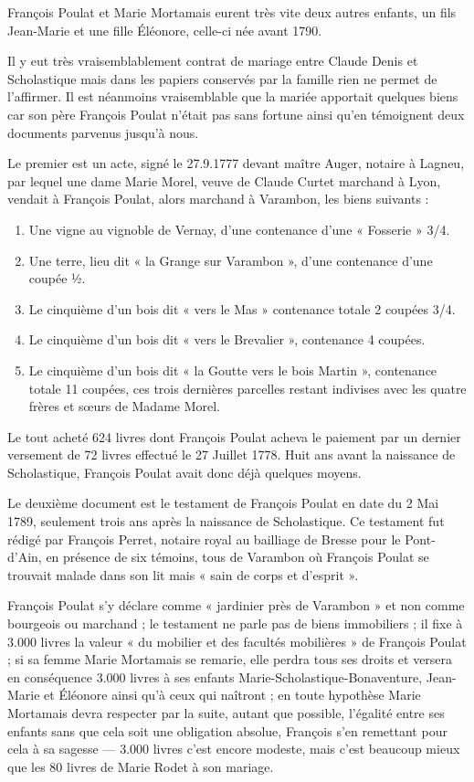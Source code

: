 \documentclass[11pt,a4paper]{report}
\providecommand{\tightlist}{\setlength{\itemsep}{0pt}\setlength{\parskip}{0pt}}
\begin{document}
François Poulat et Marie Mortamais eurent très vite deux autres enfants, un fils Jean-Marie et une fille Éléonore, celle-ci née avant 1790.

Il y eut très vraisemblablement contrat de mariage entre Claude Denis et Scholastique mais dans les papiers conservés par la famille rien ne permet de l'affirmer. Il est néanmoins vraisemblable que la mariée apportait quelques biens car son père François Poulat n'était pas sans fortune ainsi qu'en témoignent deux documents parvenus jusqu'à nous.

Le premier est un acte, signé le 27.9.1777 devant maître Auger, notaire à Lagneu, par lequel une dame Marie Morel, veuve de Claude Curtet marchand à Lyon, vendait à François Poulat, alors marchand à Varambon, les biens suivants :

\begin{enumerate}
\def\labelenumi{\arabic{enumi}.}
\tightlist
\item
  Une vigne au vignoble de Vernay, d'une contenance d'une « Fosserie » 3/4.
\item
  Une terre, lieu dit « la Grange sur Varambon », d'une contenance d'une coupée ½.
\item
  Le cinquième d'un bois dit « vers le Mas » contenance totale 2 coupées 3/4.
\item
  Le cinquième d'un bois dit « vers le Brevalier », contenance 4 coupées.
\item
  Le cinquième d'un bois dit « la Goutte vers le bois Martin », contenance totale 11 coupées, ces trois dernières parcelles restant indivises avec les quatre frères et sœurs de Madame Morel.
\end{enumerate}

Le tout acheté 624 livres dont François Poulat acheva le paiement par un dernier versement de 72 livres effectué le 27 Juillet 1778. Huit ans avant la naissance de Scholastique, François Poulat avait donc déjà quelques moyens.


Le deuxième document est le testament de François Poulat en date du 2 Mai 1789, seulement trois ans après la naissance de Scholastique. Ce testament fut rédigé par François Perret, notaire royal au bailliage de Bresse pour le Pont-d'Ain, en présence de six témoins, tous de Varambon où François Poulat se trouvait malade dans son lit mais « sain de corps et d'esprit ».

François Poulat s'y déclare comme « jardinier près de Varambon » et non comme bourgeois ou marchand ; le testament ne parle pas de biens immobiliers ; il fixe à 3.000 livres la valeur « du mobilier et des facultés mobilières » de François Poulat ; si sa femme Marie Mortamais se remarie, elle perdra tous ses droits et versera en conséquence 3.000 livres à ses enfants Marie-Scholastique-Bonaventure, Jean-Marie et Éléonore ainsi qu'à ceux qui naîtront ; en toute hypothèse Marie Mortamais devra respecter par la suite, autant que possible, l'égalité entre ses enfants sans que cela soit une obligation absolue, François s'en remettant pour cela à sa sagesse --- 3.000 livres c'est encore modeste, mais c'est beaucoup mieux que les 80 livres de Marie Rodet à son mariage.
\end{document}
